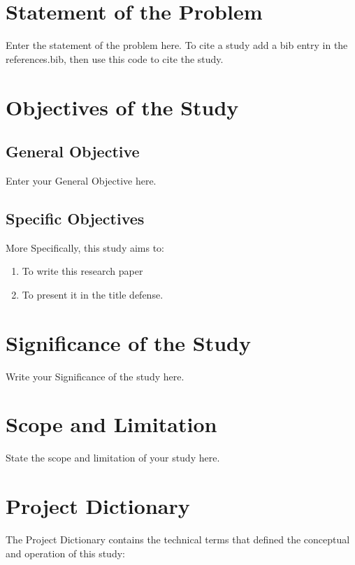 \begin{refsection}
\section{Statement of the Problem}

Enter the statement of the problem here. To cite a study add a bib entry in the references.bib, then use this code \cite{noauthor_biblatex_nodate} to cite the study.

\section{Objectives of the Study}

\subsection{General Objective}

Enter your General Objective here.

\subsection{Specific Objectives}

More Specifically, this study aims to:

\begin{enumerate}
    \item To write this research paper
    \item To present it in the title defense.
\end{enumerate}
   

\section{Significance of the Study}

Write your Significance of the study here.

\section{Scope and Limitation}

State the scope and limitation of your study here.

\section{Project Dictionary}

The Project Dictionary contains the technical terms that defined the conceptual and operation of this study:


\end{refsection}
